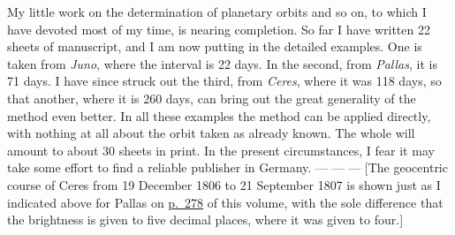 \par\indent My little work on the determination of planetary orbits and so on, to which I have devoted most of my time, is nearing completion. So far I have written 22 sheets of manuscript, and I am now putting in the detailed examples. One is taken from \emph{Juno}, where the interval is 22 days. In the second, from \emph{Pallas}, it is 71 days. I have since struck out the third, from \emph{Ceres}, where it was 118 days, so that another, where it is 260 days, can bring out the great generality of the method even better. In all these examples the method can be applied directly, with nothing at all about the orbit taken as already known. The whole will amount to about 30 sheets in print. In the present circumstances, I fear it may take some effort to find a reliable publisher in Germany. --- --- --- [The geocentric course of Ceres from 19 December 1806 to 21 September 1807 is shown just as I indicated above for Pallas on \hyperlink{native-283}{p.~278} of this volume, with the sole difference that the brightness is given to five decimal places, where it was given to four.]
